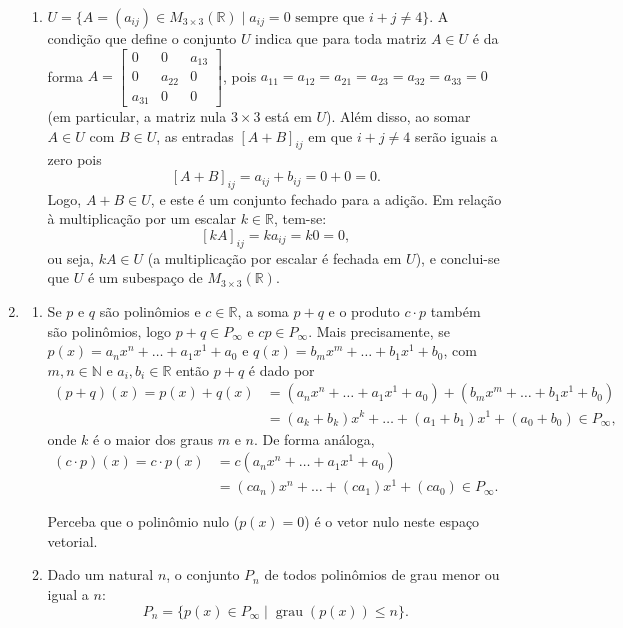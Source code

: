 \documentclass[12pt,a4paper]{article}
\newcommand*\N{\mathbb{N}}
\newcommand*\R{\mathbb{R}}
\begin{document}
\begin{enumerate}
\begin{enumerate}
\item
$U = \{ A = (a_{ij}) \in M_{3 \times 3}(\R) \mid a_{ij} = 0 \text{ sempre que } i + j \neq 4 \}$.
A condição que define o conjunto $U$ indica que para toda matriz $A \in U$ é da forma $A = \begin{bmatrix}
     0 &      0 & a_{13}\\
     0 & a_{22} & 0     \\
a_{31} &      0 & 0
\end{bmatrix}$, pois $a_{11} = a_{12} = a_{21} = a_{23} = a_{32} = a_{33} = 0$ (em particular, a matriz nula $3 \times 3$ está em $U$). Além disso, ao somar $A \in U$ com $B \in U$, as entradas $[A+B]_{ij}$ em que $i+j \neq 4$ serão iguais a zero pois
\[[A+B]_{ij} = a_{ij} + b_{ij} = 0 + 0 = 0.\]
Logo, $A+B \in U$, e este é um conjunto fechado para a adição. Em relação à multiplicação por um escalar $k \in \R$, tem-se:
\[[kA]_{ij} = ka_{ij} = k0 = 0,\]
ou seja, $kA \in U$ (a multiplicação por escalar é fechada em $U$), e conclui-se que $U$ é um subespaço de $M_{3 \times 3} (\R)$.
\end{enumerate}
\item 
\begin{enumerate}
\item
Se $p$ e $q$ são polinômios e $c \in \R$, a soma $p+q$ e o produto $c \cdot p$ também são polinômios, logo $p + q \in P_\infty$ e $cp \in P_\infty$. Mais precisamente, se $p(x) = a_n x^n + \ldots + a_1 x^1 + a_0$ e $q(x) = b_m x^m + \ldots + b_1 x^1 + b_0$, com $m, n \in \N$ e $a_i,b_i \in \R$ então $p + q$ é dado por
\begin{align*}
(p + q)(x)
= p(x)+q(x)
& = (a_n x^n + \ldots + a_1 x^1 + a_0)
  + (b_m x^m + \ldots + b_1 x^1 + b_0) \\
& = (a_k + b_k) x^k + \ldots + (a_1+b_1) x^1 + (a_0+b_0) \in P_\infty,
\end{align*}
onde $k$ é o maior dos graus $m$ e $n$. De forma análoga,
\begin{align*}
(c \cdot p)(x)
= c \cdot p(x)
& = c(a_n x^n + \ldots + a_1 x^1 + a_0) \\
& = (ca_n) x^n + \ldots + (ca_1) x^1 + (ca_0) \in P_\infty.
\end{align*}

Perceba que o polinômio nulo ($p(x) = 0$) é o vetor nulo neste espaço vetorial.

\item Dado um natural $n$, o conjunto $P_n$ de todos polinômios de grau menor ou igual a $n$:
\[
P_n = \{ p(x) \in P_\infty \mid \operatorname{grau}(p(x)) \leq n \}.
\]


\end{enumerate}
\end{enumerate}
\end{document}
